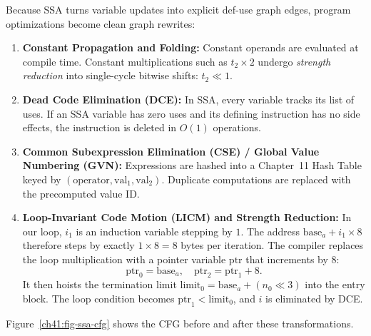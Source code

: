 Because SSA turns variable updates into explicit def-use graph edges, program
optimizations become clean graph rewrites:
\begin{enumerate}
  \item \textbf{Constant Propagation and Folding:} Constant operands are evaluated
  at compile time. Constant multiplications such as $t_2 \times 2$ undergo
  \emph{strength reduction} into single-cycle bitwise shifts: $t_2 \ll 1$.
  \item \textbf{Dead Code Elimination (DCE):} In SSA, every variable tracks its
  list of uses. If an SSA variable has zero uses and its defining instruction has
  no side effects, the instruction is deleted in $O(1)$ operations.
  \item \textbf{Common Subexpression Elimination (CSE) / Global Value Numbering (GVN):}
  Expressions are hashed into a Chapter~11 Hash Table keyed
  by $(\text{operator}, \text{val}_1, \text{val}_2)$. Duplicate computations are
  replaced with the precomputed value ID.
  \item \textbf{Loop-Invariant Code Motion (LICM) and Strength Reduction:}
  In our loop, $i_1$ is an induction variable stepping by $1$. The address
  $\text{base}_a + i_1 \times 8$ therefore steps by exactly $1 \times 8 = 8$ bytes
  per iteration. The compiler replaces the loop multiplication with a pointer
  variable $\text{ptr}$ that increments by $8$:
  \[
    \text{ptr}_0 = \text{base}_a,\quad \text{ptr}_2 = \text{ptr}_1 + 8.
  \]
  It then hoists the termination limit $\text{limit}_0 = \text{base}_a + (n_0 \ll 3)$
  into the entry block. The loop condition becomes $\text{ptr}_1 < \text{limit}_0$,
  and $i$ is eliminated by DCE.
\end{enumerate}

Figure~\ref{ch41:fig-ssa-cfg} shows the CFG before and after these transformations.

